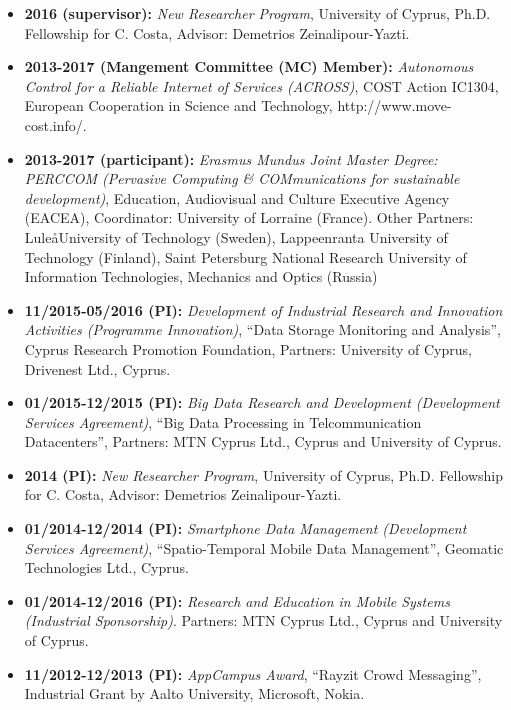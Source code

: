 \documentclass[10pt]{article}
\begin{document}
\begin{itemize}
\item  {\bf 2016 (supervisor):} {\em New Researcher Program}, University of Cyprus, Ph.D. Fellowship for C. Costa, Advisor: Demetrios Zeinalipour-Yazti.

\item {\bf 2013-2017 (Mangement Committee (MC) Member):}  {\em Autonomous Control for a Reliable Internet of Services (ACROSS)}, COST Action IC1304, European Cooperation in Science and Technology,  http://www.move-cost.info/.

\item {\bf 2013-2017 (participant):} {\em Erasmus Mundus Joint Master Degree: PERCCOM (Pervasive Computing \& COMmunications for sustainable development)}, Education, Audiovisual and Culture Executive Agency (EACEA), Coordinator: University of Lorraine (France). Other Partners: Lule\aa University of Technology (Sweden), Lappeenranta University of Technology (Finland), Saint Petersburg National Research University of Information Technologies, Mechanics and Optics (Russia)

\item {\bf 11/2015-05/2016 (PI):} {\em Development of Industrial Research and Innovation Activities (Programme Innovation)}, ``Data Storage Monitoring and Analysis'', Cyprus Research Promotion Foundation,  Partners: University of Cyprus, Drivenest Ltd., Cyprus.

\item {\bf 01/2015-12/2015 (PI):} {\em Big Data Research and Development (Development Services Agreement)}, ``Big Data Processing in Telcommunication Datacenters'', Partners: MTN Cyprus Ltd., Cyprus and University of Cyprus.

\item  {\bf 2014 (PI):} {\em New Researcher Program}, University of Cyprus, Ph.D. Fellowship for C. Costa, Advisor: Demetrios Zeinalipour-Yazti.  

\item {\bf 01/2014-12/2014 (PI):} {\em Smartphone Data Management (Development Services Agreement)}, ``Spatio-Temporal Mobile Data Management'', Geomatic Technologies Ltd., Cyprus.

\item {\bf 01/2014-12/2016 (PI):} {\em Research and Education in Mobile Systems (Industrial Sponsorship)}. Partners: MTN Cyprus Ltd., Cyprus and University of Cyprus.

\item {\bf 11/2012-12/2013 (PI):} {\em AppCampus Award}, ``Rayzit Crowd Messaging'', Industrial Grant by Aalto University, Microsoft, Nokia.


\end{itemize}
\end{document}
